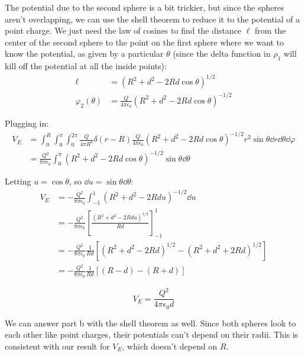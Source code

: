 \documentclass{article}
\begin{document}
The potential due to the second sphere is a bit trickier, but since the spheres aren't overlapping, we can use the shell theorem to reduce it to the potential of a point charge. We just need the law of cosines to find the distance $\ell$ from the center of the second sphere to the point on the first sphere where we want to know the potential, as given by a particular $\theta$ (since the delta function in $\rho_1$ will kill off the potential at all the inside points):
\[
\begin{aligned}
	\ell &= \left(R^2 + d^2 - 2Rd\cos\theta\right)^{1/2} \\
	\varphi_2(\theta) &= \frac{Q}{4\pi\epsilon_0}\left(R^2 + d^2 - 2Rd\cos\theta\right)^{-1/2}
\end{aligned}
\]

Plugging in:
\[
\begin{aligned}
	V_E &= \int_0^R\int_0^\pi\int_0^{2\pi}\frac{Q}{4\pi R^2}\delta(r-R)\frac{Q}{4\pi\epsilon_0}\left(R^2 + d^2 - 2Rd\cos\theta\right)^{-1/2}r^2\sin\theta\dd{r}\dd{\theta}\dd{\varphi} \\
	&= \frac{Q^2}{8\pi\epsilon_0}\int_0^\pi\left(R^2 + d^2 - 2Rd\cos\theta\right)^{-1/2}\sin\theta\dd{\theta}
\end{aligned}
\]


Letting $u = \cos\theta$, so $\dd{u} = \sin\theta\dd{\theta}$:
\[
\begin{aligned}
	V_E &= -\frac{Q^2}{8\pi\epsilon_0}\int_{-1}^1\left(R^2 + d^2 - 2Rdu\right)^{-1/2}\dd{u} \\
	&= -\frac{Q^2}{8\pi\epsilon_0}\left[\frac{\left(R^2 + d^2 - 2Rdu\right)^{1/2}}{Rd}\right]_{-1}^1 \\
	&= -\frac{Q^2}{8\pi\epsilon_0}\frac{1}{Rd}\left[\left(R^2 + d^2 - 2Rd\right)^{1/2} - \left(R^2 + d^2 + 2Rd\right)^{1/2}\right] \\
	&= -\frac{Q^2}{8\pi\epsilon_0}\frac{1}{Rd}\left[(R-d) - (R+d)\right]
\end{aligned}
\]

\begin{equation}
	\boxed{V_E = \frac{Q^2}{4\pi\epsilon_0d}}\tag{3.17a}\label{eq:3.17a}
\end{equation}

We can answer part b with the shell theorem as well. Since both spheres look to each other like point charges, their potentials can't depend on their radii. This is consistent with our result for $V_E$, which doesn't depend on $R$.

\hrulefill
\end{document}
